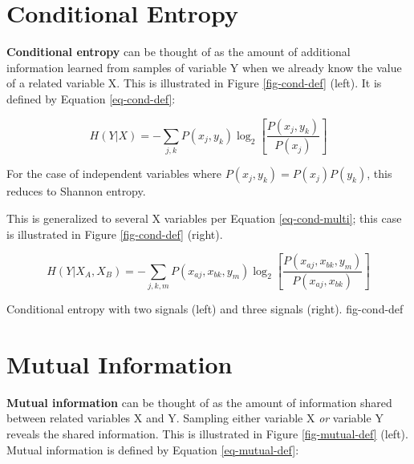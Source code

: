 \section{Conditional Entropy}
\label{sect-entropy-cond}

\textbf{Conditional entropy} can be thought of as the amount of additional
information learned from samples of variable Y when we already know the
value of a related variable X. This is illustrated in Figure
\ref{fig-cond-def} (left). It is defined by Equation \ref{eq-cond-def}:

\begin{equation}
H(Y|X) = - \sum_{j,k} P(x_j,y_k) \log_2 \left [
\frac{P(x_j,y_k)}{P(x_j)} \right ]
\label{eq-cond-def}
\end{equation}

For the case of independent variables where $P(x_j,y_k) = P(x_j) P(y_k)$,
this reduces to Shannon entropy.

This is generalized to several X variables per Equation \ref{eq-cond-multi};
this case is illustrated in Figure \ref{fig-cond-def} (right).

\begin{equation}
H(Y|X_A,X_B) = - \sum_{j,k,m} P(x_{aj},x_{bk},y_m) \log_2 \left [
\frac{P(x_{aj},x_{bk},y_m)}{P(x_{aj},x_{bk})} \right ]
\label{eq-cond-multi}
\end{equation}

{Conditional entropy with two signals (left) and three signals (right).}
{fig-cond-def}

\clearpage
%
\section{Mutual Information}
\label{sect-entropy-mutual}

\textbf{Mutual information} can be thought of as the amount of information
shared between related variables X and Y. Sampling either variable X
\textit{or} variable Y reveals the shared information. This is illustrated
in Figure \ref{fig-mutual-def} (left). Mutual information is defined by
Equation \ref{eq-mutual-def}:

